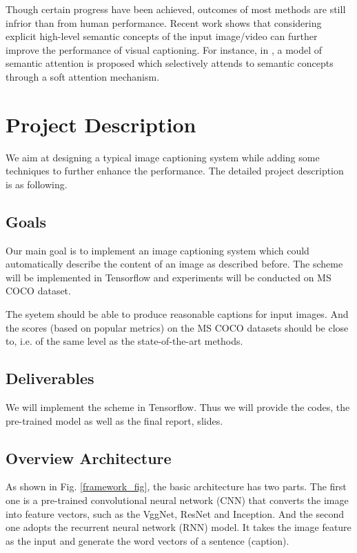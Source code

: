 \documentclass[conference]{IEEEtran}
\begin{document}
Though certain progress have been achieved, outcomes of most methods are still infrior than from human performance. Recent work shows that considering explicit high-level semantic concepts of the input image/video can further improve the performance of visual captioning. For instance, in \cite{you2016image}, a model of semantic attention is proposed which selectively attends to semantic concepts through a soft attention mechanism.



\section{Project Description}
We aim at designing a typical image captioning system while adding some techniques to further enhance the performance. The detailed project description is as following.
\subsection{Goals}
Our main goal is to implement an image captioning system which could automatically describe the content of an image as described before. The scheme will be implemented in Tensorflow and experiments will be conducted on MS COCO dataset.

The syetem should be able to produce reasonable captions for input images. And the scores (based on popular metrics) on the MS COCO datasets should be close to, i.e. of the same level as the state-of-the-art methods.

\subsection{Deliverables}

We will implement the scheme in Tensorflow. Thus we will provide the codes, the pre-trained model as well as the final report, slides.
\subsection{Overview Architecture}

As shown in Fig. \ref{framework_fig}, the basic architecture has two parts. The first one is a pre-trained convolutional neural network (CNN) that converts the image into feature vectors, such as the VggNet, ResNet and Inception. And the second one adopts the recurrent neural network (RNN) model. It takes the image feature as the input and generate the word vectors of a sentence (caption).
\end{document}
